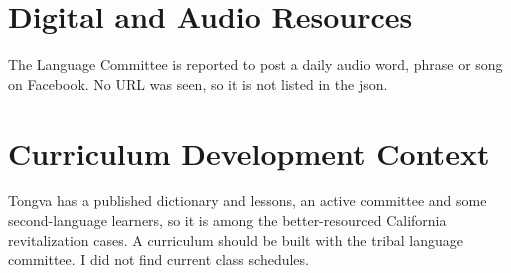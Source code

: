 \documentclass[12pt]{article}
\begin{document}
\section{Digital and Audio Resources}
The Language Committee is reported to post a daily audio word, phrase or song on Facebook. No URL was seen, so it is not listed in the json.

\section{Curriculum Development Context}
Tongva has a published dictionary and lessons, an active committee and some second-language learners, so it is among the better-resourced California revitalization cases. A curriculum should be built with the tribal language committee. I did not find current class schedules.
\end{document}
